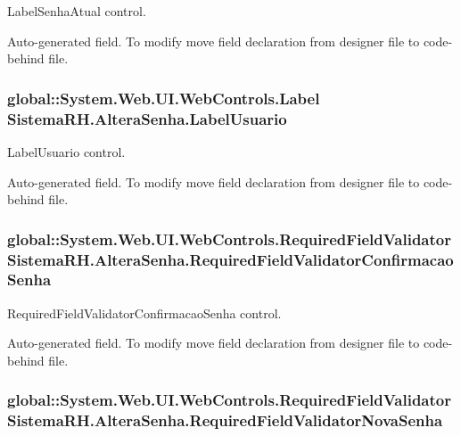 LabelSenhaAtual control. 

Auto-\/generated field. To modify move field declaration from designer file to code-\/behind file. \hypertarget{class_sistema_r_h_1_1_altera_senha_ac17b3383fc4877fb40f0abc0a03cfcc7}{
\subsubsection[{LabelUsuario}]{\setlength{\rightskip}{0pt plus 5cm}global::System.Web.UI.WebControls.Label {\bf SistemaRH.AlteraSenha.LabelUsuario}}}
\label{class_sistema_r_h_1_1_altera_senha_ac17b3383fc4877fb40f0abc0a03cfcc7}


LabelUsuario control. 

Auto-\/generated field. To modify move field declaration from designer file to code-\/behind file. \hypertarget{class_sistema_r_h_1_1_altera_senha_a28522541ac0e83258952471704f365ab}{
\subsubsection[{RequiredFieldValidatorConfirmacaoSenha}]{\setlength{\rightskip}{0pt plus 5cm}global::System.Web.UI.WebControls.RequiredFieldValidator {\bf SistemaRH.AlteraSenha.RequiredFieldValidatorConfirmacaoSenha}}}
\label{class_sistema_r_h_1_1_altera_senha_a28522541ac0e83258952471704f365ab}


RequiredFieldValidatorConfirmacaoSenha control. 

Auto-\/generated field. To modify move field declaration from designer file to code-\/behind file. \hypertarget{class_sistema_r_h_1_1_altera_senha_a5548e2085fb497f82d03bf8587545cfe}{
\subsubsection[{RequiredFieldValidatorNovaSenha}]{\setlength{\rightskip}{0pt plus 5cm}global::System.Web.UI.WebControls.RequiredFieldValidator {\bf SistemaRH.AlteraSenha.RequiredFieldValidatorNovaSenha}}}
\label{class_sistema_r_h_1_1_altera_senha_a5548e2085fb497f82d03bf8587545cfe}


